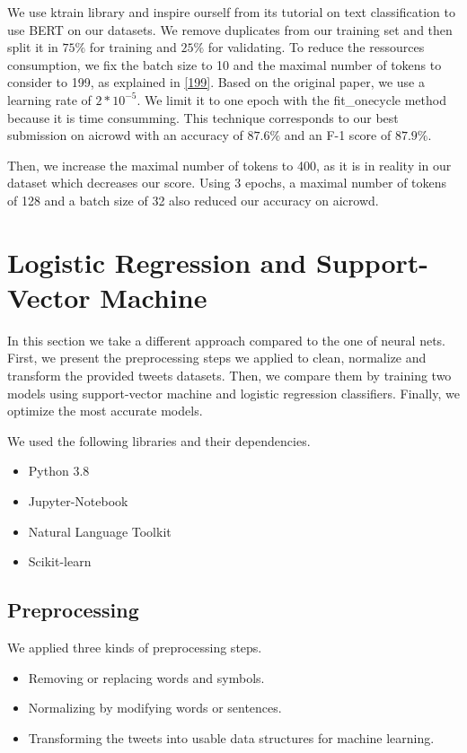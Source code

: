 \documentclass[11pt, a4paper, twocolumn]{article}
\begin{document}
We use ktrain library\cite{ktrain} and inspire ourself from its tutorial on text classification to use BERT on our datasets. We remove duplicates from our training set and then split it in $75\%$ for training and $25\%$ for validating. To reduce the ressources consumption, we fix the batch size to 10 and the maximal number of tokens to consider to 199, as explained in \ref{199}. Based on the original paper, we use a learning rate of $2*10^{-5}$. We limit it to one epoch with the fit\_onecycle method because it is time consumming. This technique corresponds to our best submission on aicrowd with an accuracy of $87.6\%$ and an F-1 score of $87.9\%$.

Then, we  increase the maximal number of tokens to 400, as it is in reality in our dataset which decreases our score. Using 3 epochs, a maximal number of tokens of 128 and a batch size of 32 also reduced our accuracy on aicrowd.

\section{Logistic Regression and Support-Vector Machine}
In this section we take a different approach compared to the one of neural nets. First, we present the preprocessing steps we applied to clean, normalize and transform the provided tweets datasets. Then, we compare them by training two models using support-vector machine and logistic regression classifiers. Finally, we optimize the most accurate models.

We used the following libraries and their dependencies.
\begin{itemize}
	\setlength\itemsep{1px}
	\item Python 3.8
	\item Jupyter-Notebook
	\item Natural Language Toolkit
	\item Scikit-learn
\end{itemize}

\subsection{Preprocessing}
We applied three kinds of preprocessing steps.
\begin{itemize}
	\setlength\itemsep{1px}
	\item Removing or replacing words and symbols.
	\item Normalizing by modifying words or sentences.
	\item Transforming the tweets into usable data structures for machine learning.
\end{itemize}
\end{document}
